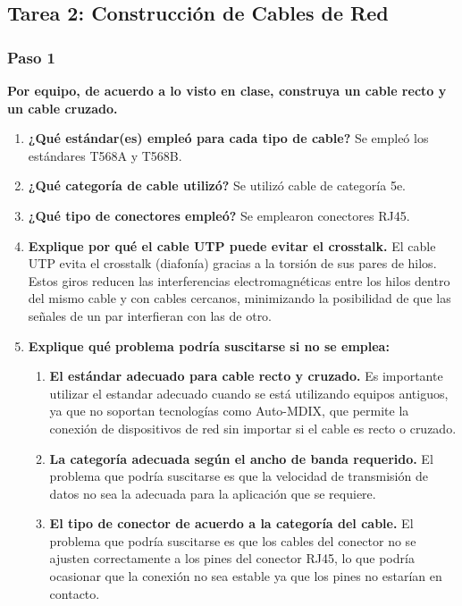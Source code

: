     \subsection{Tarea 2: Construcción de Cables de Red}
        \subsubsection*{Paso 1}
        \textbf{Por equipo, de acuerdo a lo visto en clase, construya un cable recto y un cable cruzado.}
        \begin{enumerate}
            \item \textbf{¿Qué estándar(es) empleó para cada tipo de cable?}
            Se empleó los estándares T568A y T568B.
            \item \textbf{¿Qué categoría de cable utilizó?}
            Se utilizó cable de categoría 5e.
            \item \textbf{¿Qué tipo de conectores empleó?}
            Se emplearon conectores RJ45.
            \item \textbf{Explique por qué el cable UTP puede evitar el crosstalk.}
            El cable UTP evita el crosstalk (diafonía) gracias a la torsión de sus pares de hilos. Estos giros reducen las interferencias electromagnéticas entre los hilos dentro del mismo cable y con cables cercanos, minimizando la posibilidad de que las señales de un par interfieran con las de otro.
            \item \textbf{Explique qué problema podría suscitarse si no se emplea:}
            \begin{enumerate}
                \item \textbf{El estándar adecuado para cable recto y cruzado.}
                Es importante utilizar el estandar adecuado cuando se está utilizando equipos antiguos, ya que no soportan tecnologías como Auto-MDIX, que permite la conexión de dispositivos de red sin importar si el cable es recto o cruzado.
                \item \textbf{La categoría adecuada según el ancho de banda requerido.}
                El problema que podría suscitarse es que la velocidad de transmisión de datos no sea la adecuada para la aplicación que se requiere.
                \item \textbf{El tipo de conector de acuerdo a la categoría del cable.}
                El problema que podría suscitarse es que los cables del conector no se ajusten correctamente a los pines del conector RJ45, lo que podría ocasionar que la conexión no sea estable ya que los pines no estarían en contacto.
            \end{enumerate}
        \end{enumerate}

